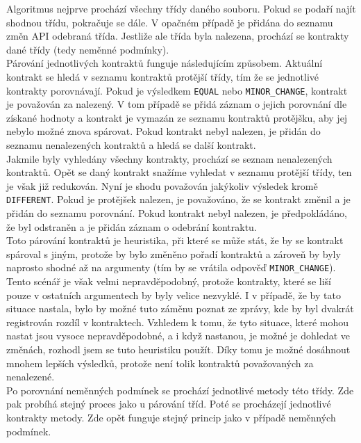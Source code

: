 	    	Algoritmus nejprve prochází všechny třídy daného souboru. Pokud se podaří najít shodnou třídu, pokračuje se dále. V opačném případě je přidána do seznamu změn API odebraná třída. Jestliže ale třída byla nalezena, prochází se kontrakty dané třídy (tedy neměnné podmínky).\\
	    	
	    	Párování jednotlivých kontraktů funguje následujícím způsobem. Aktuální kontrakt se hledá v seznamu kontraktů protější třídy, tím že se jednotlivé kontrakty porovnávají. Pokud je výsledkem \texttt{EQUAL} nebo \texttt{MINOR\_CHANGE}, kontrakt je považován za nalezený. V tom případě se přidá záznam o jejich porovnání dle získané hodnoty a kontrakt je vymazán ze seznamu kontraktů protějšku, aby jej nebylo možné znova spárovat. Pokud kontrakt nebyl nalezen, je přidán do seznamu nenalezených kontraktů a hledá se další kontrakt.\\
	    	
	    	Jakmile byly vyhledány všechny kontrakty, prochází se seznam nenalezených kontraktů. Opět se daný kontrakt snažíme vyhledat v seznamu protější třídy, ten je však již redukován. Nyní je shodu považován jakýkoliv výsledek kromě \texttt{DIFFERENT}. Pokud je protějšek nalezen, je považováno, že se kontrakt změnil a je přidán do seznamu porovnání. Pokud kontrakt nebyl nalezen, je předpokládáno, že byl odstraněn a je přidán záznam o odebrání kontraktu.\\
	    	
	    	Toto párování kontraktů je heuristika, při které se může stát, že by se kontrakt spároval s jiným, protože by bylo změněno pořadí kontraktů a zároveň by byly naprosto shodné až na argumenty (tím by se vrátila odpověď \texttt{MINOR\_CHANGE}). Tento scénář je však velmi nepravděpodobný, protože kontrakty, které se liší pouze v ostatních argumentech by byly velice nezvyklé. I v případě, že by tato situace nastala, bylo by možné tuto záměnu poznat ze zprávy, kde by byl dvakrát registrován rozdíl v kontraktech. Vzhledem k tomu, že tyto situace, které mohou nastat jsou vysoce nepravděpodobné, a i když nastanou, je možné je dohledat ve změnách, rozhodl jsem se tuto heuristiku použít. Díky tomu je možné dosáhnout mnohem lepších výsledků, protože není tolik kontraktů považovaných za nenalezené.\\
	    	
	    	Po porovnání neměnných podmínek se prochází jednotlivé metody této třídy. Zde pak probíhá stejný proces jako u párování tříd. Poté se procházejí jednotlivé kontrakty metody. Zde opět funguje stejný princip jako v případě neměnných podmínek.\\
	    	
